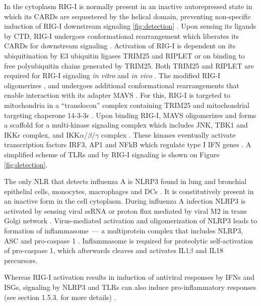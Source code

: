 		In the cytoplasm \gls{RIG-I} is normally present in an inactive autorepressed state in which its \glspl{CARD} are sequestered by the helical domain, preventing non-specific induction of \gls{RIG-I} downstream signaling \ref{fig:detection} \parencite{Kowalinski2011}. Upon sensing its ligands by \gls{CTD}, \gls{RIG-I} undergoes conformational rearrangement which liberates its \glspl{CARD} for downstream signaling \parencite{Kowalinski2011}. Activation of \gls{RIG-I} is  dependent on its ubiquitination by E3 ubiquitin ligases TRIM25 and RIPLET or on binding to free polyubiquitin chains generated by TRIM25. Both TRIM25 and RIPLET are required for \gls{RIG-I} signaling \textit{in vitro} and \textit{in vivo} \parencite{Gack2007, Oshiumi2010, Zeng2010}. The modified \gls{RIG-I} oligomerizes \parencite{Patel2013}, and undergoes additional conformational rearrangements that enable interaction with its adapter \gls{MAVS} \parencite{Kawai2005, Seth2005}. For this, \gls{RIG-I} is targeted to mitochondria in a ``translocon'' complex containing TRIM25 and mitochondrial targeting chaperone 14-3-3$\epsilon$ \parencite{Liu2012}. Upon binding \gls{RIG-I}, \gls{MAVS} oligomerizes and forms a scaffold for a multi-kinase signaling complex which includes \gls{JNK}, \gls{TBK1} and \gls{IKK}$\epsilon$ complex, and \gls{IKK}$\alpha$/$\beta$/$\gamma$ complex \parencite{McWhirter2005}. These kinases eventually activate transcription factors \gls{IRF}3, \gls{AP1} and \gls{NFkB} which regulate type I \gls{IFN} genes \parencite{McWhirter2005}. A simplified scheme of \glspl{TLR} and by \gls{RIG-I} signaling is shown on Figure \ref{fig:detection}.
		
		The only \gls{NLR} that detects influenza A is \gls{NLRP3} found in lung and bronchial epithelial cells, monocytes, macrophages and \gls{DC}s \parencite{Guarda2011, Kim2014}. It is constitutively present in an inactive form in the cell cytoplasm. During influenza A infection \gls{NLRP3} is activated by sensing viral \gls{ssRNA} or proton flux mediated by viral \gls{M2} in trans Golgi network \parencite{Thomas2009, Ichinohe2010, Allen2009}. Virus-mediated activation and oligomerization of \gls{NLRP3} leads to formation of inflammasome~--- a multiprotein complex that includes \gls{NLRP3}, \gls{ASC} and pro-caspase 1 \parencite{Tschopp2010}. Inflammasome is required for proteolytic self-activation of pro-caspase 1, which afterwards cleaves and activates IL1$\beta$ and IL18 precursors.
	
		Whereas \gls{RIG-I} activation results in induction of antiviral responses by \gls{IFN}s and \gls{ISG}s, signaling by \gls{NLRP3} and \glspl{TLR} can also induce pro-inflammatory responses (see section 1.5.3. for more details) \parencite{LeGoffic2007, Allen2009, Kawai2007}. 
		
